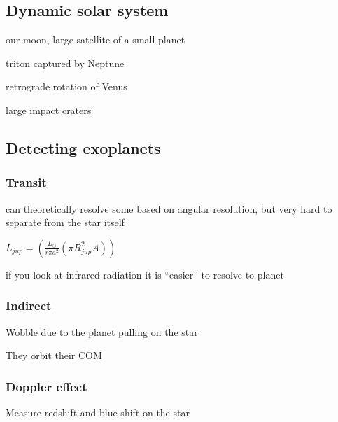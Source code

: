 \documentclass{article}
\begin{document}
\subsection{Dynamic solar system}
\begin{list}{-}{}
\item our moon, large satellite of a small planet
\item triton captured by Neptune
\item retrograde rotation of Venus
\item large impact craters
\end{list}

\subsection{Detecting exoplanets}
\subsubsection{Transit}
\begin{list}{-}{}
\item can theoretically resolve some based on angular resolution, but very hard to separate from the star itself
\item \(L_{jup} = (\frac{L_\odot}{r\pi a^2}(\pi R^2_{jup}A))\)
\item if you look at infrared radiation it is ``easier'' to resolve to planet
\end{list}

\subsubsection{Indirect}
\begin{list}{-}{}
\item Wobble due to the planet pulling on the star
\item They orbit their COM
\end{list}

\subsubsection{Doppler effect}
\begin{list}{-}{}
\item Measure redshift and blue shift on the star
\end{list}
\end{document}
